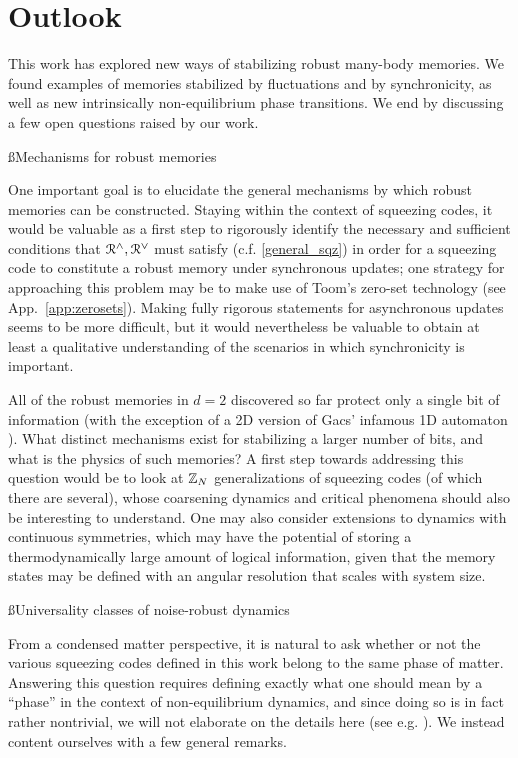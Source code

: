 \documentclass[pra,aps,twocolumn,groupedaddress,superscriptaddress,nofootinbib,preprintnumbers]{revtex4-2}
\begin{document}
	\section{Outlook}\label{sec:outlook}
	
	This work has explored new ways of stabilizing robust many-body memories. We found examples of memories stabilized by fluctuations and by synchronicity, as well as new intrinsically non-equilibrium phase transitions. We end by discussing a few open questions raised by our work. 
	
	\ss{Mechanisms for robust memories } 
	
	One important goal is to elucidate the general mechanisms by which robust memories can be constructed.
	Staying within the context of squeezing codes, it would be valuable as a first step to rigorously identify the necessary and sufficient conditions that $\mathcal{R}^\wedge,\mathcal{R}^\vee$ must satisfy (c.f. \eqref{general_sqz}) in order for a squeezing code to constitute a robust memory under synchronous updates; one strategy for approaching this problem may be to make use of Toom's zero-set technology (see App.~\ref{app:zerosets}). Making fully rigorous statements for asynchronous updates seems to be more difficult, but it would nevertheless be valuable to obtain at least a qualitative understanding of the scenarios in which synchronicity is important.
	
	All of the robust memories in $d=2$ discovered so far protect only a single bit of information (with the exception of a 2D version of Gacs' infamous 1D automaton \cite{gacs1989self}). What distinct mechanisms exist for stabilizing a larger number of bits, and what is the physics of such memories? A first step towards addressing this question would be to look at $\mathbb{Z}_N$ generalizations of squeezing codes (of which there are several), whose coarsening dynamics and critical phenomena should also be interesting to understand. One may also consider extensions to dynamics with continuous symmetries, which may have the potential of storing a thermodynamically large amount of logical information, given that the memory states may be defined with an angular resolution that scales with system size. 
	
	
	\ss{Universality classes of noise-robust dynamics}
	
	From a condensed matter perspective, it is natural to ask whether or not the various squeezing codes defined in this work belong to the same phase of matter. Answering this question requires defining exactly what one should mean by a ``phase'' in the context of non-equilibrium dynamics, and since doing so is in fact rather nontrivial, we will not elaborate on the details here (see e.g.  \cite{rakovszky2024defining}). We instead content ourselves with a few general remarks. 
	
\end{document}
